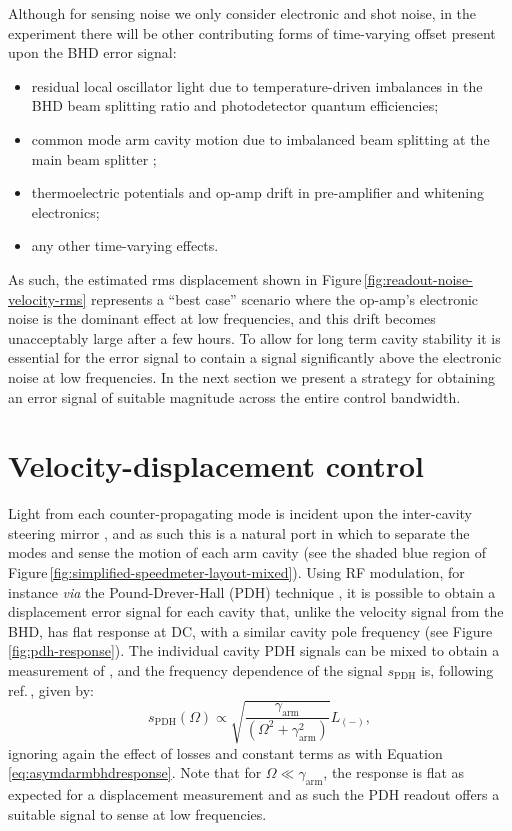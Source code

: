 Although for sensing noise we only consider electronic and shot noise, in the experiment there will be other contributing forms of time-varying offset present upon the \gls{BHD} error signal:
\begin{itemize}
  \item residual local oscillator light due to temperature-driven imbalances in the \gls{BHD} beam splitting ratio and photodetector quantum efficiencies;
  \item common mode arm cavity motion due to imbalanced beam splitting at the main beam splitter \cite{Danilishin2015};
  \item thermoelectric potentials and op-amp drift in pre-amplifier and whitening electronics;
  \item any other time-varying effects.
\end{itemize}
As such, the estimated rms displacement shown in Figure\,\ref{fig:readout-noise-velocity-rms} represents a ``best case'' scenario where the op-amp's electronic noise is the dominant effect at low frequencies, and this drift becomes unacceptably large after a few hours. To allow for long term cavity stability it is essential for the error signal to contain a signal significantly above the electronic noise at low frequencies. In the next section we present a strategy for obtaining an error signal of suitable magnitude across the entire control bandwidth.
 
\section{\label{sec:mixed-control}Velocity-displacement control}
   
Light from each counter-propagating mode is incident upon the inter-cavity steering mirror \MINT{}, and as such this is a natural port in which to separate the modes and sense the motion of each arm cavity (see the shaded blue region of Figure\,\ref{fig:simplified-speedmeter-layout-mixed}). Using RF modulation, for instance \emph{via} the Pound-Drever-Hall (\gls{PDH}) technique \cite{Drever1983}, it is possible to obtain a displacement error signal for each cavity that, unlike the velocity signal from the \gls{BHD}, has flat response at \gls{DC}, with a similar cavity pole frequency (see Figure\,\ref{fig:pdh-response}). The individual cavity \gls{PDH} signals can be mixed to obtain a measurement of \LMINUS{}, and the frequency dependence of the signal $s_{\textrm{PDH}}$ is, following ref.\,\cite{Kimble2001}, given by:
\begin{equation}
  \label{eq:m9darmpdhresponse}
  s_{\textrm{PDH}} \left( \Omega \right) \propto \sqrt{\frac{\gamma_{\textrm{arm}}}{\left(\Omega^2 + \gamma_{\textrm{arm}}^2 \right)}} L_{\left(-\right)},
\end{equation}
ignoring again the effect of losses and constant terms as with Equation \ref{eq:asymdarmbhdresponse}. Note that for $\Omega \ll \gamma_{\textrm{arm}}$, the response is flat as expected for a displacement measurement and as such the PDH readout offers a suitable signal to sense \LMINUS{} at low frequencies.

